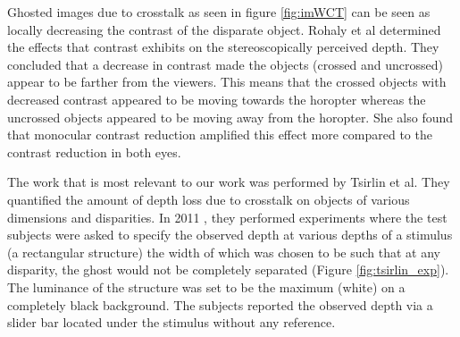 Ghosted images due to crosstalk as seen in figure \ref{fig:imWCT} can be seen as locally decreasing the contrast of the disparate object. Rohaly et al \cite{rohaly1999effects} determined the effects that contrast exhibits on the stereoscopically perceived depth. They concluded that a decrease in contrast made the objects (crossed and uncrossed) appear to be farther from the viewers. This means that the crossed objects with decreased contrast appeared to be moving towards the horopter whereas the uncrossed objects appeared to be moving away from the horopter. She also found that monocular contrast reduction amplified this effect more compared to the contrast reduction in both eyes.

The work that is most relevant to our work was performed by Tsirlin et al. They quantified the amount of depth loss due to crosstalk on objects of various dimensions and disparities. In 2011 \cite{tsirlin2011effect}, they performed experiments where the test subjects were asked to specify the observed depth at various depths of a stimulus (a rectangular structure) the width of which was chosen to be such that at any disparity, the ghost would not be completely separated (Figure \ref{fig:tsirlin_exp}). The luminance of the structure was set to be the maximum (white) on a completely black background. The subjects reported the observed depth via a slider bar located under the stimulus without any reference.
